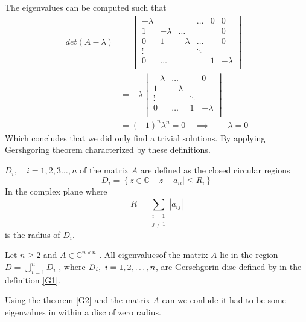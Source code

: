 \documentclass{article}
\theoremstyle{remark}
\newcommand{\newpara}
  {
  \vskip 0.4cm
  }
\begin{document}
\newpara
The eigenvalues can be computed such that \[
  \begin{split}
  det \left( A - \lambda   \right) &= \begin{vmatrix} 
  -\lambda &   &   &      \ldots  & 0 & 0 \\
  1  &  -\lambda  & \ldots  &   &   & 0 \\
  0  & 1  & - \lambda   &  \ldots  &   & 0 \\
  \vdots  &   &  &   \ddots  \\
  0  &  \ldots  &  &    & 1    & - \lambda      \\
  \end{vmatrix} 
    \\
   &= -\lambda  \begin{vmatrix} 
   -\lambda   &  \ldots  &      & 0 \\
  1  & - \lambda  &      \\
  \vdots  & &    \ddots  \\
  0  &  \ldots & 1    & -\lambda      \\
  \end{vmatrix} 
    \\
   &=\left( -1 \right)^{n}   \lambda^{n}  = 0 \quad   \implies  \quad \quad \lambda  = 0
  \end{split} 
\] 
Which concludes that we did only find a trivial solutions. By applying Gershgoring theorem \cite {sul} characterized by these definitions.
\begin{definition}
  \label{G1}
  $D_{i}, \quad i = 1,2,3 \ldots, n$ of the matrix $A$ are defined as the closed circular regions \[
  D_{i} = \left\{ z \in  \mathbb{C}  \mid  \left\lvert z - a_{ii} \right\rvert \le R_{i} \right\}
  \] 
  In the complex plane where \[
  R = \sum_{\substack{i = 1 \\ j \neq 1} }^{}  \left\lvert a_{ij} \right\rvert 
  \] 
  is the radius of $D_{i}$.
  
\end{definition}

\begin{theorem}
  \label{G2}
  Let $n\ge2$ and $A \in  \mathbb{C} ^{n \times  n}$ . All eigenvaluesof the matrix $A$ lie in the region $D =  \bigcup_{i=1}^{n} D_{i}$ , where $D_{i}, \\\ i = 1,2,\ldots,n $, are Gerschgorin disc defined by in the definition \ref{G1}.
\end{theorem}
Using the theorem \ref{G2} and the matrix $A$ can we conlude it had to be some eigenvalues in within a disc of zero radius.
\end{document}
